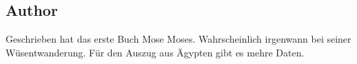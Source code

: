 \subsection{Author}
Geschrieben hat das erste Buch Mose Moses. Wahrscheinlich irgenwann bei seiner Wüsentwanderung.
Für den Auszug aus Ägypten gibt es mehre Daten.